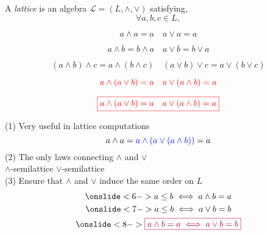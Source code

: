 
\begin{frame}{}
  \begin{definition}[Lattice]
    A {\it lattice} is an algebra $\mathcal{L} = (L, \land, \lor)$ satisfying, 
    \[
      \forall a, b, c \in L,
    \]
    \vspace{-0.50cm}
    \begin{description}[Commutativity:]
      \item[\teal{Idempotency:}]
	\[
	  a \land a = a \quad a \lor a = a
	\]
      \item[Commutativity:]
	\[
	  a \land b = b \land a \quad a \lor b = b \lor a
	\]
      \item[Associativity:]
	\[
	  (a \land b) \land c = a \land (b \land c) \quad (a \lor b) \lor c = a \lor (b \lor c)
	\]
      \item[Absorption:]
	\[
	  \textcolor{red}{a \land (a \lor b) = a} \quad \textcolor{red}{a \lor (a \land b) = a}
	\]
    \end{description}
  \end{definition}
\end{frame}

\begin{frame}{}
  \[
    \textcolor{red}{\boxed{a \land (a \lor b) = a \quad a \lor (a \land b) = a}}
  \]

  \pause
  \vspace{0.30cm}
  \begin{center}
    (1) Very useful in lattice computations \\[-0.60cm] \pause
    \[
      a \land a = \textcolor{blue}{a \land (a \lor (a \land b))} = a
    \]
    \pause
    (2) The only laws connecting $\land$ and $\lor$ \\[10pt] \pause
    $\land$-semilattice \qquad $\lor$-semilattice \\[15pt] \pause
    (3) Ensure that $\land$ and $\lor$ induce the same order on $L$  \pause
    \begin{gather*}
      \onslide<6->{a \le b \iff a \land b = a} \\
      \onslide<7->{a \le b \iff a \lor b = b} \\
      \onslide<8->{\purple{\boxed{a \land b = a \iff a \lor b = b}}} 
    \end{gather*}
  \end{center}
\end{frame}

